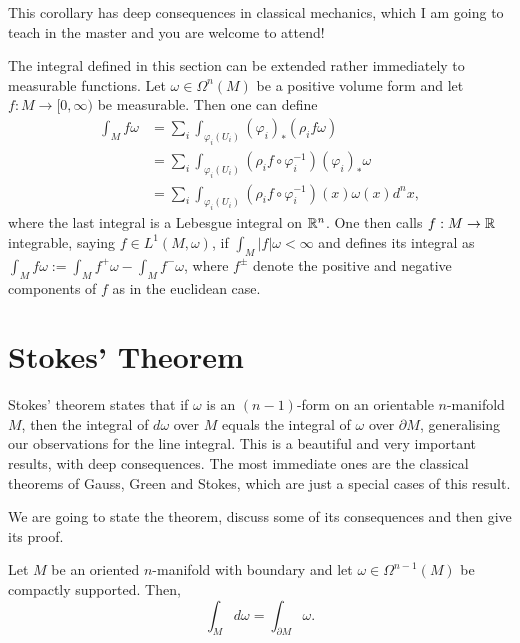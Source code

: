 This corollary has deep consequences in classical mechanics, which I am going to teach in the master and you are welcome to attend!

\begin{remark}
  The integral defined in this section can be extended rather immediately to measurable functions.
  Let $\omega\in\Omega^n(M)$ be a positive volume form and let $f:M\to[0,\infty)$ be measurable.
  Then one can define
  \begin{align}
    \int_M f \omega
    &= \sum_i \int_{\varphi_i(U_i)} (\varphi_i)_*(\rho_i f\omega) \\
    &= \sum_i \int_{\varphi_i(U_i)} (\rho_i f \circ\varphi_i^{-1}) (\varphi_i)_*\omega \\
    &= \sum_i \int_{\varphi_i(U_i)} (\rho_i f \circ\varphi_i^{-1})(x) \omega(x) d^n x,
  \end{align}
  where the last integral is a Lebesgue integral on $\mathbb{R}^n$.
  One then calls $f:M\to \mathbb{R}$ integrable, saying $f\in L^1(M,\omega)$, if $\int_M|f|\omega < \infty$ and defines its integral as $\int_M f\omega := \int_M f^+\omega - \int_M f^-\omega$, where $f^\pm$ denote the positive and negative components of $f$ as in the euclidean case.
\end{remark}

\section{Stokes' Theorem}

Stokes' theorem states that if $\omega$ is an $(n-1)$-form on an orientable $n$-manifold $M$, then the integral of $d\omega$ over $M$ equals the integral of $\omega$ over $\partial M$, generalising our observations for the line integral.
This is a beautiful and very important results, with deep consequences. The most immediate ones are the classical theorems of Gauss, Green and Stokes, which are just a special cases of this result.

We are going to state the theorem, discuss some of its consequences and then give its proof.

\begin{theorem}\label{thm:Stokes}
  Let $M$ be an oriented $n$-manifold with boundary and let $\omega\in\Omega^{n-1}(M)$ be compactly supported.
  Then,
  \begin{equation}\label{eq:Stokes}
    \int_M d\omega = \int_{\partial M} \omega.
  \end{equation}
\end{theorem}

